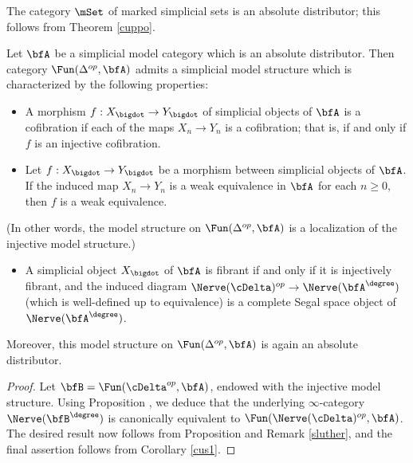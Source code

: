 \begin{example}
The category $\mSet$ of marked simplicial sets is an absolute distributor; this follows from
Theorem \ref{cuppo}.
\end{example}

\begin{proposition}\label{camper}
Let $\bfA$ be a simplicial model category which is an absolute distributor. Then category
$\Fun( \Delta^{op}, \bfA)$ admits a simplicial model structure which is characterized by the following properties:
\begin{itemize}
\item[$(C)$] A morphism $f: X_{\bigdot} \rightarrow Y_{\bigdot}$ of simplicial objects of
$\bfA$ is a cofibration if each of the maps $X_{n} \rightarrow Y_{n}$ is a cofibration; that is,
if and only if $f$ is an injective cofibration.

\item[$(W)$] Let $f: X_{\bigdot} \rightarrow Y_{\bigdot}$ be a morphism between simplicial objects of $\bfA$. If the induced map $X_{n} \rightarrow Y_{n}$ is a weak equivalence in $\bfA$ for each $n \geq 0$, then $f$ is a weak equivalence. 
\end{itemize}

(In other words, the model structure on $\Fun( \Delta^{op}, \bfA)$
is a localization of the injective model structure.)

\begin{itemize}
\item[$(F)$] A simplicial object $X_{\bigdot}$ of $\bfA$ is fibrant if and only if
it is injectively fibrant, and the induced diagram $\Nerve( \cDelta)^{op} \rightarrow \Nerve( \bfA^{\degree} )$ (which is well-defined up to equivalence) is a complete Segal space object
of $\Nerve(\bfA^{\degree})$. 
\end{itemize}

Moreover, this model structure on $\Fun( \Delta^{op}, \bfA)$ is again an absolute distributor.
\end{proposition}

\begin{proof}
Let $\bfB = \Fun( \cDelta^{op}, \bfA)$, endowed with the injective model structure. Using
Proposition , we deduce that the underlying $\infty$-category
$\Nerve( \bfB^{\degree} )$ is canonically equivalent to $\Fun( \Nerve(\cDelta)^{op}, \bfA)$.
The desired result now follows from Proposition  and Remark \ref{sluther},
and the final assertion follows from Corollary \ref{cus1}.
\end{proof}

